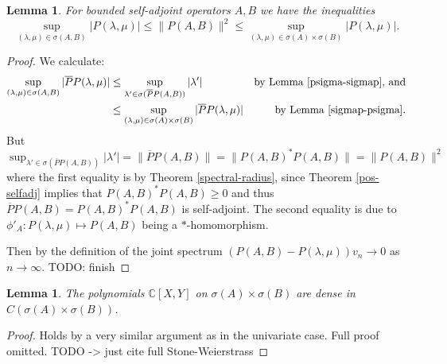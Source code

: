 \documentclass[12pt,oneside]{report}
\newtheorem{lem}[thm]{Lemma}
\begin{document}
\begin{lem}\label{spectral-ub}
    For bounded self-adjoint operators $A,B$ we have the inequalities$$\sup_{(\lambda,\mu) \in \sigma(A,B)} |P(\lambda,\mu)| \le \|P(A,B)\|^{2} \le \sup_{(\lambda,\mu) \in \sigma(A)\times\sigma(B)} |P(\lambda,\mu)|.$$
\end{lem}
\begin{proof}
    We calculate:
    \begin{align*}
        \sup_{(\lambda,\mu) \in \sigma(A,B)} |\overline{P}P(\lambda,\mu)|
        &\leq \sup_{\lambda' \in \sigma(\overline{P}P(A,B))} |\lambda'| & \text{by Lemma \ref{psigma-sigmap}, and} \\
        &\leq \sup_{(\lambda,\mu) \in \sigma(A) \times \sigma(B)} |\overline{P}P(\lambda,\mu)| & \text{by Lemma \ref{sigmap-psigma}}.
    \end{align*}
    But $\sup_{\lambda' \in \sigma(\overline{P}P(A,B))} |\lambda'| = \|\overline{P}P(A,B)\| = \|P(A,B)^{*}P(A,B)\| = \|P(A,B)\|^{2}$ where the first equality is by Theorem \ref{spectral-radius}, since Theorem \ref{pos-selfadj} implies that $P(A,B)^{*}P(A,B) \geq 0$ and thus $\overline{P}P(A,B) = P(A,B)^{*}P(A,B)$ is self-adjoint. The second equality is due to $\phi'_{A} : P(\lambda,\mu) \mapsto P(A,B)$ being a $*$-homomorphism.

    Then by the definition of the joint spectrum $(P(A,B) - P(\lambda,\mu))v_{n} \to 0$ as $n \to \infty$. TODO: finish
\end{proof}

\begin{lem}
    The polynomials $\mathbb{C}[X,Y]$ on $\sigma(A) \times \sigma (B)$ are dense in $C(\sigma(A) \times \sigma(B))$.
\end{lem}
\begin{proof}
    Holds by a very similar argument as in the univariate case. Full proof omitted. TODO -> just cite full Stone-Weierstrass
\end{proof}
\end{document}

